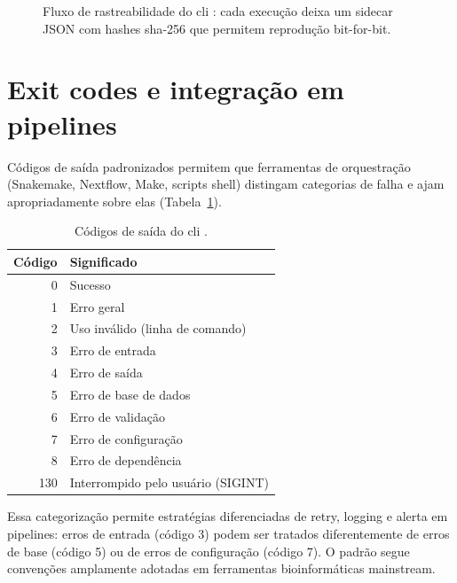 \begin{figure}[htbp]
\centering
{}
\caption{Fluxo de rastreabilidade do \gls{cli} \biorempp{}: cada execução deixa um sidecar JSON com hashes \gls{sha}-256 que permitem reprodução bit-for-bit.}
\label{fig:c4-sidecars}
\end{figure}

\section{Exit codes e integração em pipelines}
\label{sec:c4-exitcodes}

Códigos de saída padronizados permitem que ferramentas de orquestração (Snakemake, Nextflow, Make, scripts shell) distingam categorias de falha e ajam apropriadamente sobre elas (Tabela~\ref{tab:c4-exitcodes}).

\begin{table}[htbp]
\centering
\caption{Códigos de saída do \gls{cli} \biorempp{}.}
\label{tab:c4-exitcodes}
\small
\begin{tabular}{@{}rl@{}}
\toprule
\textbf{Código} & \textbf{Significado} \\
\midrule
0   & Sucesso \\
1   & Erro geral \\
2   & Uso inválido (linha de comando) \\
3   & Erro de entrada \\
4   & Erro de saída \\
5   & Erro de base de dados \\
6   & Erro de validação \\
7   & Erro de configuração \\
8   & Erro de dependência \\
130 & Interrompido pelo usuário (SIGINT) \\
\bottomrule
\end{tabular}
\end{table}

Essa categorização permite estratégias diferenciadas de retry, logging e alerta em pipelines: erros de entrada (código 3) podem ser tratados diferentemente de erros de base (código 5) ou de erros de configuração (código 7). O padrão segue convenções amplamente adotadas em ferramentas bioinformáticas mainstream.


